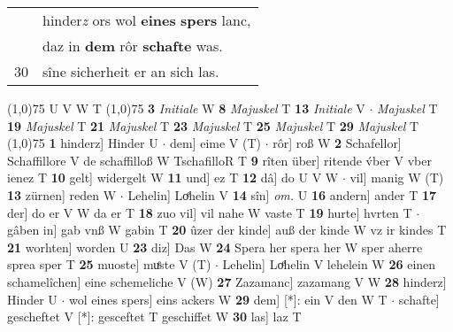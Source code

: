 \documentclass[8pt,a4paper,notitlepage]{article}
\begin{document}
\begin{table}[ht]
\begin{minipage}[t]{0.5\linewidth}
\begin{tabular}{rl}
 & hinder\textit{z} ors wol \textbf{eines} \textbf{spers} lanc,\\ 
 & daz in \textbf{dem} rôr \textbf{schafte} was.\\ 
30 & sîne sicherheit er an sich las.\\ 
\end{tabular}
\scriptsize
\line(1,0){75} \newline
U V W T \newline
\line(1,0){75} \newline
\textbf{3} \textit{Initiale} W  \textbf{8} \textit{Majuskel} T  \textbf{13} \textit{Initiale} V   $\cdot$ \textit{Majuskel} T  \textbf{19} \textit{Majuskel} T  \textbf{21} \textit{Majuskel} T  \textbf{23} \textit{Majuskel} T  \textbf{25} \textit{Majuskel} T  \textbf{29} \textit{Majuskel} T  \newline
\line(1,0){75} \newline
\textbf{1} hinderz] Hinder U  $\cdot$ dem] eime V (T)  $\cdot$ rôr] roß W \textbf{2} Schafellor] Schaffillore V de schaffilloß W TschafilloR T \textbf{9} rîten über] ritende v́ber V vber ienez T \textbf{10} gelt] widergelt W \textbf{11} und] ez T \textbf{12} dâ] do U V W  $\cdot$ vil] manig W (T) \textbf{13} zürnen] reden W  $\cdot$ Lehelin] Loͤhelin V \textbf{14} sîn] \textit{om.} U \textbf{16} andern] ander T \textbf{17} der] do er V W da er T \textbf{18} zuo vil] vil nahe W vaste T \textbf{19} hurte] hvrten T  $\cdot$ gâben in] gab vnß W gabin T \textbf{20} ûzer der kinde] auß der kinde W vz ir kindes T \textbf{21} worhten] worden U \textbf{23} diz] Das W \textbf{24} Spera her spera her W sper aherre sprea sper T \textbf{25} muoste] muͤste V (T)  $\cdot$ Lehelin] Loͤhelin V lehelein W \textbf{26} einen schamelîchen] eine schemeliche V (W) \textbf{27} Zazamanc] zazamang V W \textbf{28} hinderz] Hinder U  $\cdot$ wol eines spers] eins ackers W \textbf{29} dem] [*]: ein V den W T  $\cdot$ schafte] gescheftet V [*]: gesceftet T geschiffet W \textbf{30} las] laz T \newline
\end{minipage}
\end{table}
\end{document}
